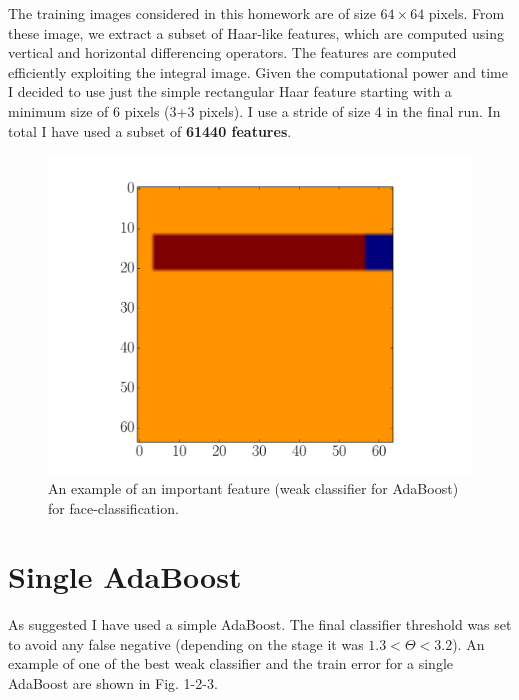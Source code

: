 \documentclass[11pt]{amsart}
\begin{document}
The training images considered in this homework are of size $64\times64$ pixels.
From these image, we extract a subset of Haar-like features, which are computed using vertical and horizontal differencing operators. The features are computed efficiently exploiting the integral image.
Given the computational power and time I decided to use just the simple rectangular Haar feature starting with a minimum size of 6 pixels (3+3 pixels). I use a stride of size 4 in the final run. In total I have used a subset of \textbf{61440 features}.
\begin{figure}[htbp]
\begin{center}
\includegraphics[scale=0.2]{feature3.pdf}
\caption{An example of an important feature (weak classifier for AdaBoost) for face-classification.}
\label{default}
\end{center}
\end{figure}



\section{Single AdaBoost}

As suggested I have used a simple AdaBoost. The final classifier threshold was set to avoid any false negative (depending on the stage it was $1.3<\Theta<3.2$). An example of one of the best weak classifier and the train error for a single AdaBoost are shown in Fig. 1-2-3.
\end{document}
